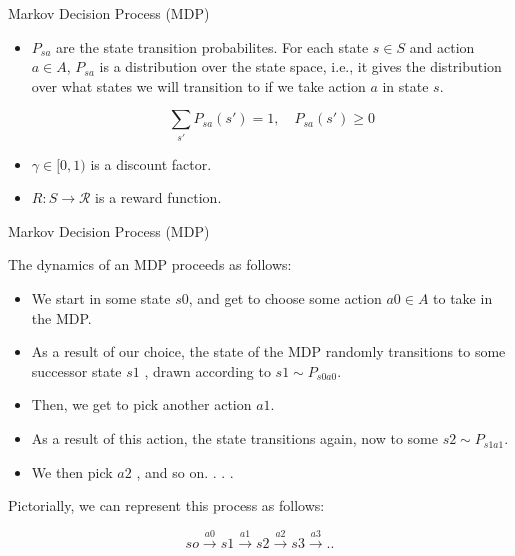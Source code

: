 \documentclass[handout]{beamer}
\begin{document}
\begin{frame}{Markov Decision Process (MDP)}
\scriptsize{
\begin{itemize}
\item $P_{sa}$ are the state transition probabilites. For each state $s \in S$ and
action $a \in A$, $P_{sa}$ is a distribution over the state space, i.e., it gives the distribution over what states we will transition to if we take action $a$ in state $s$.

\begin{displaymath}
 \sum_{s'}P_{sa}(s')=1, \quad P_{sa}(s')\geq 0
\end{displaymath}

\item $\gamma \in [0,1)$ is a discount factor.

\item $R: S \rightarrow \mathcal{R}$  is a reward function.

\end{itemize}


} 

\end{frame}




\begin{frame}{Markov Decision Process (MDP)}
\scriptsize{
The dynamics of an MDP proceeds as follows:
\begin{itemize}
\item  We start in some state $s0$, and get to choose some action $a0 \in A$ to take in the MDP.
\item As a result of our choice, the state of the MDP randomly transitions to some successor state $s1$ , drawn according to $s1 \sim P_{s0a0}$.
\item Then, we get to pick another action $a1$.
\item As a result of this action, the state transitions again, now to some $s2 \sim P_{s1a1}$.
\item We then pick $a2$ , and so on. . . . 
\end{itemize}

Pictorially, we can represent this process as follows:


\begin{displaymath}
 so \xrightarrow{a0} s1 \xrightarrow{a1} s2 \xrightarrow{a2}  s3 \xrightarrow{a3} ..
\end{displaymath}



} 

\end{frame}
\end{document}
